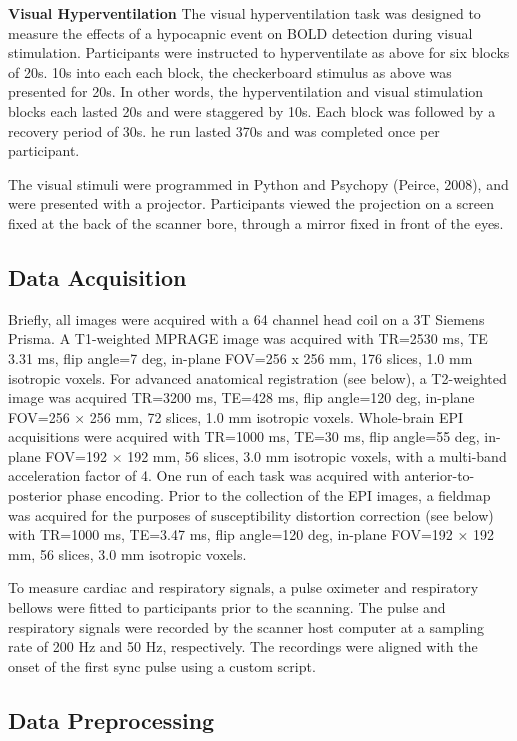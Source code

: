 \documentclass[9pt]{NEU502b-fmri}
\begin{document}
\textbf{Visual Hyperventilation} The visual hyperventilation task was designed to measure the effects of a hypocapnic event on BOLD detection during visual stimulation. Participants were instructed to hyperventilate as above for six blocks of 20s. 10s into each each block, the checkerboard stimulus as above was presented for 20s. In other words, the hyperventilation and visual stimulation blocks each lasted 20s and were staggered by 10s. Each block was followed by a recovery period of 30s. he run lasted 370s and was completed once per participant.

The visual stimuli were programmed in Python and Psychopy (Peirce, 2008), and were presented with a projector. Participants viewed the projection on a screen fixed at the back of the scanner bore, through a mirror fixed in front of the eyes.

\subsection{Data Acquisition}
Briefly, all images were acquired with a 64 channel head coil on a 3T Siemens Prisma. A T1-weighted MPRAGE image was acquired with TR=2530 ms,  TE 3.31 ms, flip angle=7 deg, in-plane FOV=256 x 256 mm, 176 slices, 1.0 mm isotropic voxels. For advanced anatomical registration (see below), a T2-weighted image was acquired TR=3200 ms, TE=428 ms, flip angle=120 deg, in-plane FOV=256 × 256 mm, 72 slices, 1.0 mm isotropic voxels. Whole-brain EPI acquisitions were acquired with TR=1000 ms, TE=30 ms, flip angle=55 deg, in-plane FOV=192 × 192 mm, 56 slices, 3.0 mm isotropic voxels, with a multi-band acceleration factor of 4. One run of each task was acquired with anterior-to-posterior phase encoding. Prior to the collection of the EPI images, a fieldmap was acquired for the purposes of susceptibility distortion correction (see below) with TR=1000 ms, TE=3.47 ms, flip angle=120 deg, in-plane FOV=192 × 192 mm, 56 slices, 3.0 mm isotropic voxels.

To measure cardiac and respiratory signals, a pulse oximeter and respiratory bellows were fitted to participants prior to the scanning. The pulse and respiratory signals were recorded by the scanner host computer at a sampling rate of 200 Hz and 50 Hz, respectively. The recordings were aligned with the onset of the first sync pulse using a custom script. 

\subsection{Data Preprocessing}
\end{document}
